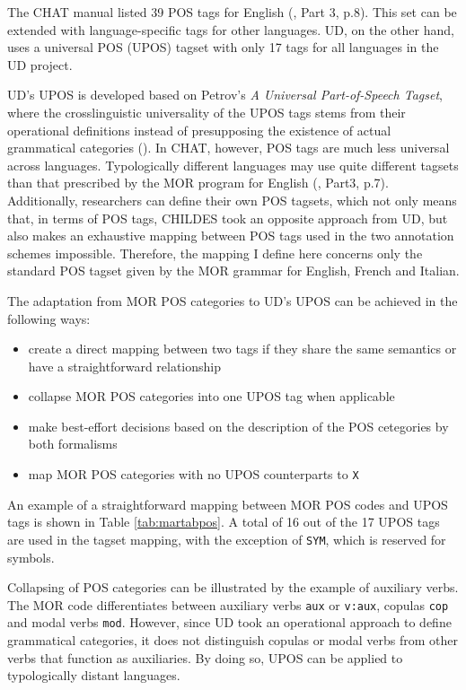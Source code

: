 The CHAT manual listed 39 POS tags for English (\cite{Macwhinney2000}, Part 3, p.8). This set can be extended with language-specific tags for other languages. UD, on the other hand, uses a universal POS (UPOS) tagset with only 17 tags for all languages in the UD project.

UD's UPOS is developed based on Petrov's \emph{A Universal Part-of-Speech Tagset}, where the crosslinguistic universality of the UPOS tags stems from their operational definitions instead of presupposing the existence of actual grammatical categories (\cite{petrov2012}). In CHAT, however, POS tags are much less universal across languages. Typologically different languages may use quite different tagsets than that prescribed by the MOR program for English (\cite{Macwhinney2000}, Part3, p.7). Additionally, researchers can define their own POS tagsets, which not only means that, in terms of POS tags, CHILDES took an opposite approach from UD, but also makes an exhaustive mapping between POS tags used in the two annotation schemes impossible. Therefore, the mapping I define here concerns only the standard POS tagset given by the MOR grammar for English, French and Italian.

The adaptation from MOR POS categories to UD's UPOS can be achieved in the following ways:
\begin{itemize}
    \item create a direct mapping between two tags if they share the same semantics or have a straightforward relationship
    \item collapse MOR POS categories into one UPOS tag when applicable
    \item make best-effort decisions based on the description of the POS cetegories by both formalisms
    \item map MOR POS categories with no UPOS counterparts to \texttt{X}
\end{itemize}

An example of a straightforward mapping between MOR POS codes and UPOS tags is shown in Table \ref{tab:martabpos}. A total of 16 out of the 17 UPOS tags are used in the tagset mapping, with the exception of \texttt{SYM}, which is reserved for symbols.

Collapsing of POS categories can be illustrated by the example of auxiliary verbs. The MOR code differentiates between auxiliary verbs \texttt{aux} or \texttt{v:aux}, copulas \texttt{cop} and modal verbs \texttt{mod}. However, since UD took an operational approach to define grammatical categories, it does not distinguish copulas or modal verbs from other verbs that function as auxiliaries. By doing so, UPOS can be applied to typologically distant languages.

